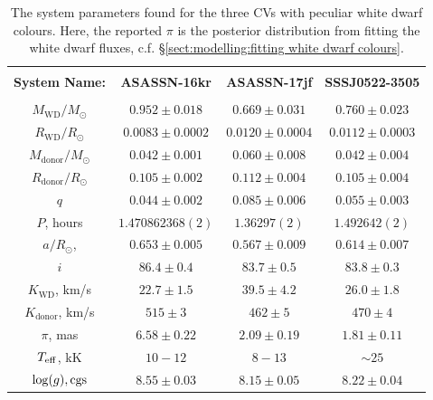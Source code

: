 \begin{table}
    \centering
    \caption{The system parameters found for the three CVs with peculiar white dwarf colours. Here, the reported $\pi$ is the posterior distribution from fitting the white dwarf fluxes, c.f. \S\ref{sect:modelling:fitting white dwarf colours}.}
    \label{table:three white dwarfs:system_parameters}
    \begin{tabular}{cccc}
        \hline \\
        \textbf{System Name:}      & \textbf{ASASSN-16kr}    & \textbf{ASASSN-17jf}  & \textbf{SSSJ0522-3505} \\
        \hline \hline \\
        $M_\mathrm{WD}/M_\odot$    & $0.952\pm0.018$         & $0.669\pm0.031$        & $0.760\pm0.023$ \\
        $R_\mathrm{WD}/R_\odot$    & $0.0083\pm0.0002$       & $0.0120\pm0.0004$      & $0.0112\pm0.0003$ \\
        $M_\mathrm{donor}/M_\odot$ & $0.042\pm0.001$         & $0.060\pm0.008$        & $0.042\pm0.004$ \\
        $R_\mathrm{donor}/R_\odot$ & $0.105\pm0.002$         & $0.112\pm0.004$        & $0.105\pm0.004$ \\
        $q$                        & $0.044\pm0.002$         & $0.085\pm0.006$        & $0.055\pm0.003$ \\
        \hline
        $P$, hours                 & $1.470862368(2)$        & $1.36297(2)$           & $1.492642(2)$ \\
        $a/R_\odot$,               & $0.653\pm0.005$         & $0.567\pm0.009$        & $0.614\pm0.007$  \\
        $i$                        & $86.4\pm0.4$            & $83.7\pm0.5$           & $83.8\pm0.3$  \\
        $K_\mathrm{WD}$, km/s      & $22.7\pm1.5$            & $39.5\pm4.2$           & $26.0\pm1.8$  \\
        $K_\mathrm{donor}$, km/s   & $515\pm3$               & $462\pm5$              & $470\pm4$  \\
        \hline
        $\pi$, mas                 & $6.58\pm0.22$           & $2.09\pm0.19$          & $1.81\pm0.11$  \\
        $T_{\rm eff}$, kK          & $10-12$                 & $8-13$                 & $\sim25$  \\
        $\log(g), {\rm cgs}$  & $8.55\pm0.03$           & $8.15\pm0.05$          & $8.22\pm0.04$  \\
        \hline
    \end{tabular}
\end{table}



